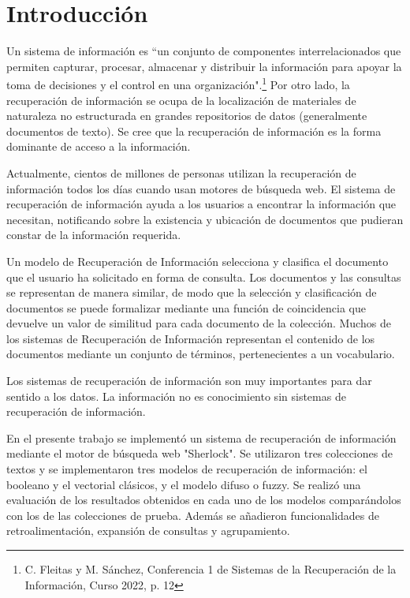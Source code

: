 \documentclass{llncs}
\begin{document}
	\newpage
	\tableofcontents
	\thispagestyle{empty}
	
	\newpage
	
	\section{Introducci\'on}
	
	Un sistema de informaci\'on es ``un conjunto de componentes interrelacionados que permiten capturar, procesar, almacenar y distribuir la informaci\'on para apoyar la toma de decisiones y el control en una organizaci\'on".\footnote{C. Fleitas y M. S\'anchez, Conferencia 1 de Sistemas de la Recuperaci\'on de la Informaci\'on, Curso 2022, p. 12}
	Por otro lado, la recuperación de información se ocupa de la localizaci\'on  de materiales de naturaleza no estructurada en grandes repositorios de datos (generalmente documentos de texto).
	Se cree que la recuperación de información es la forma dominante de acceso a la información. 
	
	Actualmente, cientos de millones de personas utilizan la recuperaci\'on de informaci\'on todos los días cuando usan motores de búsqueda web. El sistema de recuperaci\'on de informaci\'on ayuda a los usuarios a encontrar la información que necesitan, notificando sobre la existencia y ubicación de documentos que pudieran constar de la información requerida.
	
	Un modelo de Recuperación de Información selecciona y clasifica el documento que el usuario ha solicitado en forma de consulta. Los documentos y las consultas se representan de manera similar, de modo que la selección y clasificación de documentos se puede formalizar mediante una función de coincidencia que devuelve un valor de similitud para cada documento de la colección. Muchos de los sistemas de Recuperación de Información representan el contenido de los documentos mediante un conjunto de términos, pertenecientes a un vocabulario.
	
	Los sistemas de recuperación de información son muy importantes para dar sentido a los datos. La información no es conocimiento sin sistemas de recuperación de información.
	
	En el presente trabajo se implement\'o un sistema de recuperaci\'on de informaci\'on mediante el motor de b\'usqueda web "Sherlock". Se utilizaron tres colecciones de textos y se implementaron tres modelos de recuperaci\'on  de informaci\'on: el booleano y el vectorial cl\'asicos, y el modelo difuso o fuzzy. Se realiz\'o una evaluaci\'on de los resultados obtenidos en cada uno de los modelos compar\'andolos con los de las colecciones de prueba. Adem\'as se a\~nadieron funcionalidades de retroalimentaci\'on, expansi\'on de consultas y agrupamiento. 
\end{document}
